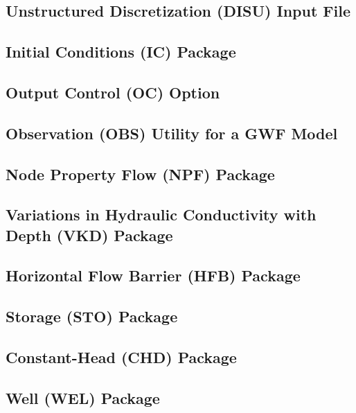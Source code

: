 \newpage
\subsection{Unstructured Discretization (DISU) Input File}


\newpage
\subsection{Initial Conditions (IC) Package}


\newpage
\subsection{Output Control (OC) Option}


\newpage
\subsection{Observation (OBS) Utility for a GWF Model}


\newpage
\subsection{Node Property Flow (NPF) Package}


\newpage
\subsection{Variations in Hydraulic Conductivity with Depth (VKD) Package}


\newpage
\subsection{Horizontal Flow Barrier (HFB) Package}


\newpage
\subsection{Storage (STO) Package}


\newpage
\subsection{Constant-Head (CHD) Package}


\newpage
\subsection{Well (WEL) Package}


